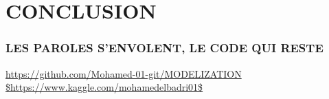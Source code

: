 \section{CONCLUSION}

\begin{frame}
\frametitle{LES PAROLES S'ENVOLENT, LE CODE QUI RESTE}
\url{https://github.com/Mohamed-01-git/MODELIZATION}
\url{$https://www.kaggle.com/mohamedelbadri01$}
\end{frame}